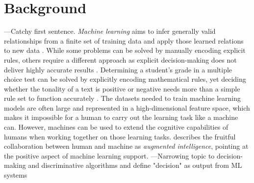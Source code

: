 \section{Background}
{\color{red}---Catchy first sentence.}\newline
\textit{Machine learning} aims to infer generally valid relationships from a finite set of training data and apply those learned relations to new data \cite{domingos2012few} \cite{kotsiantis2007supervised}. While some problems can be solved by manually encoding explicit rules, others require a different approach as explicit decision-making does not deliver highly accurate results \cite{burrell2016machine}. Determining a student's grade in a multiple choice test can be solved by explicitly encoding mathematical rules, yet deciding whether the tonality of a text is positive or negative needs more than a simple rule set to function accurately \cite{melville2009sentiment}. The datasets needed to train machine learning models are often large and represented in a high-dimensional feature space, which makes it impossible for a human to carry out the learning task like a machine can. However, machines can be used to extend the cognitive capabilities of humans when working together on those learning tasks. \cite{ventocilla2018taxonomy} describes the fruitful collaboration between human and machine as \textit{augmented intelligence}, pointing at the positive aspect of machine learning support.\newline
{\color{red}---Narrowing topic to decision-making and discriminative algorithms and define "decision" as output from ML systems}



